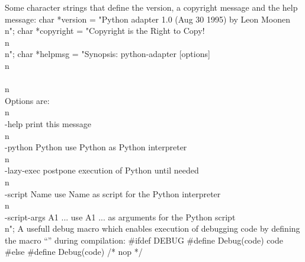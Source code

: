 Some character strings that define the version, a copyright message 
and the help message:
\nwenddocs{}\endmoddef\let\nwnotused=\nwoutput{}\nwstartdeflinemarkup{}\nwenddeflinemarkup
char *version   = "Python adapter 1.0 (Aug 30 1995) by Leon Moonen\\n";
char *copyright = "Copyright is the Right to Copy!\\n\\n";
char *helpmsg   = "Synopsis: python-adapter [options]\\n\\
\\n\\
Options are:\\n\\
-help                 print this message\\n\\
-python Python        use Python as Python interpreter\\n\\
-lazy-exec            postpone execution of Python until needed\\n\\
-script Name          use Name as script for the Python interpreter\\n\\
-script-args A1 ...   use A1 ... as arguments for the Python script\\n";
\nwendcode{}\nwdocspar
A usefull debug macro which enables execution of debugging code by
defining the macro ``'' during compilation:
\nwenddocs{}\plusendmoddef\let\nwnotused=\nwoutput{}\nwstartdeflinemarkup{}\nwenddeflinemarkup
#ifdef DEBUG
#define Debug(code)     code
#else
#define Debug(code)     /* nop */
